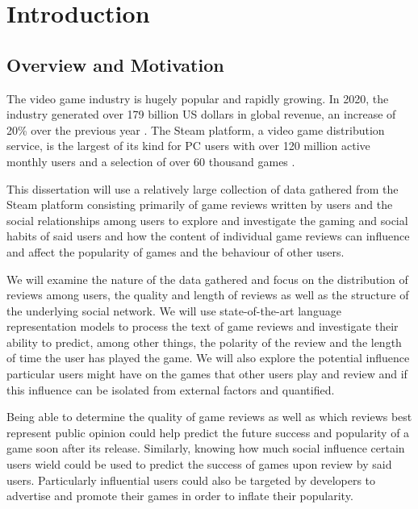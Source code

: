 \chapter{Introduction} \label{sec:Intro}

\section{Overview and Motivation} \label{sec:Intro_Overview}

The video game industry is hugely popular and rapidly growing. In 2020, the industry generated over 179 billion US dollars in global revenue, an increase of 20\% over the previous year \cite{GamingIndustrySize}. The Steam platform, a video game distribution service, is the largest of its kind for PC users \cite{SteamLargestDistributor} with over 120 million active monthly users \cite{SteamMonthlyUsers} and a selection of over 60 thousand games \cite{SteamGameCount}.

This dissertation will use a relatively large collection of data gathered from the Steam platform consisting primarily of game reviews written by users and the social relationships among users to explore and investigate the gaming and social habits of said users and how the content of individual game reviews can influence and affect the popularity of games and the behaviour of other users.

We will examine the nature of the data gathered and focus on the distribution of reviews among users, the quality and length of reviews as well as the structure of the underlying social network. We will use state-of-the-art language representation models to process the text of game reviews and investigate their ability to predict, among other things, the polarity of the review and the length of time the user has played the game. We will also explore the potential influence particular users might have on the games that other users play and review and if this influence can be isolated from external factors and quantified.

Being able to determine the quality of game reviews as well as which reviews best represent public opinion could help predict the future success and popularity of a game soon after its release. Similarly, knowing how much social influence certain users wield could be used to predict the success of games upon review by said users. Particularly influential users could also be targeted by developers to advertise and promote their games in order to inflate their popularity.

